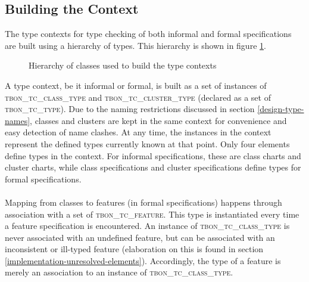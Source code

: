 \subsection{Building the Context}
\label{implementation-context-class-structure}
The type contexts for type checking of both informal and formal specifications are built using a hierarchy of types. This hierarchy is shown in figure \ref{fig:context-classes}.
\begin{figure}[H]
    \centerline{}
    \caption[Context classes]{Hierarchy of classes used to build the type contexts}
    \label{fig:context-classes}
\end{figure}
A type context, be it informal or formal, is built as a set of instances of \textsc{tbon\_tc\_class\_type}  and \textsc{tbon\_tc\_cluster\_type}  (declared as a set of \textsc{tbon\_tc\_type}). Due to the naming restrictions discussed in section \ref{design-type-names}, classes and clusters are kept in the same context for convenience and easy detection of name clashes. At any time, the instances in the context represent the defined types currently known at that point. Only four \bon{} elements define types in the context. For informal specifications, these are class charts and cluster charts, while class specifications and cluster specifications define types for formal specifications.
\paragraph{} Mapping from classes to features (in formal specifications) happens through association with a set of \textsc{tbon\_tc\_feature}. This type is instantiated every time a feature specification is encountered. An instance of \textsc{tbon\_tc\_class\_type} is never associated with an undefined feature, but can be associated with an inconsistent or ill-typed feature (elaboration on this is found in section \ref{implementation-unresolved-elements}). Accordingly, the type of a feature is merely an association to an instance of \textsc{tbon\_tc\_class\_type}.
